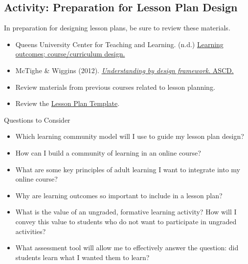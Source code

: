 \documentclass[
]{book}
\providecommand{\tightlist}{%
  \setlength{\itemsep}{0pt}\setlength{\parskip}{0pt}}
\begin{document}
\hypertarget{activity-preparation-for-lesson-plan-design}{%
\subsection*{Activity: Preparation for Lesson Plan Design}\label{activity-preparation-for-lesson-plan-design}}

\begin{reflect}
In preparation for designing lesson plans, be sure to review these materials.

\begin{itemize}
\tightlist
\item
  Queens University Center for Teaching and Learning. (n.d.) \href{http://www.queensu.ca/ctl/teaching-support/course-and-program-design}{Learning outcomes; course/curriculum design.}\\
\item
  McTighe \& Wiggins (2012). \href{https://www.ascd.org/ASCD/pdf/siteASCD/publications/UbD_WhitePaper0312.pdf}{\emph{Understanding by design framework}. ASCD.}\\
\item
  Review materials from previous courses related to lesson planning.\\
\item
  Review the \href{assets/u3LDRS_667_Lesson_Plan_Template.docx}{Lesson Plan Template}.
\end{itemize}

{Questions to Consider}

\begin{itemize}
\tightlist
\item
  Which learning community model will I use to guide my lesson plan design?\\
\item
  How can I build a community of learning in an online course?\\
\item
  What are some key principles of adult learning I want to integrate into my online course?\\
\item
  Why are learning outcomes so important to include in a lesson plan?\\
\item
  What is the value of an ungraded, formative learning activity? How will I convey this value to students who do not want to participate in ungraded activities?\\
\item
  What assessment tool will allow me to effectively answer the question: did students learn what I wanted them to learn?
\end{itemize}
\end{reflect}
\end{document}
